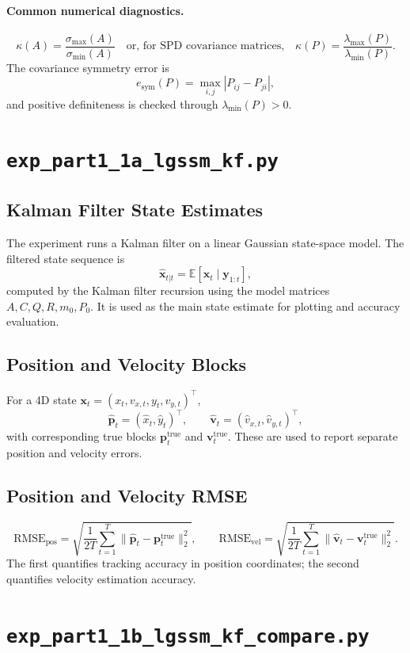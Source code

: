 \documentclass[11pt]{article}
\newcommand{\code}[1]{\texttt{#1}}
\newcommand{\E}{\mathbb{E}}
\newcommand{\RMSE}{\mathrm{RMSE}}
\begin{document}
\paragraph{Common numerical diagnostics.}
\[
\kappa(A)=\frac{\sigma_{\max}(A)}{\sigma_{\min}(A)}
\quad\text{or, for SPD covariance matrices,}\quad
\kappa(P)=\frac{\lambda_{\max}(P)}{\lambda_{\min}(P)}.
\]
The covariance symmetry error is
\[
e_{\mathrm{sym}}(P)=\max_{i,j}|P_{ij}-P_{ji}|,
\]
and positive definiteness is checked through \(\lambda_{\min}(P)>0\).

\clearpage

\section{\code{exp\_part1\_1a\_lgssm\_kf.py}}
\subsection*{Kalman Filter State Estimates}
The experiment runs a Kalman filter on a linear Gaussian state-space model. The filtered state sequence is
\[
\hat{\bm{x}}_{t|t}=\E[\bm{x}_t\mid \bm{y}_{1:t}],
\]
computed by the Kalman filter recursion using the model matrices \(A,C,Q,R,m_0,P_0\). It is used as the main state estimate for plotting and accuracy evaluation.

\subsection*{Position and Velocity Blocks}
For a 4D state \(\bm{x}_t=(x_t,v_{x,t},y_t,v_{y,t})^\top\),
\[
\hat{\bm{p}}_t=(\hat x_t,\hat y_t)^\top,\qquad
\hat{\bm{v}}_t=(\hat v_{x,t},\hat v_{y,t})^\top,
\]
with corresponding true blocks \(\bm{p}^{\mathrm{true}}_t\) and \(\bm{v}^{\mathrm{true}}_t\). These are used to report separate position and velocity errors.

\subsection*{Position and Velocity RMSE}
\[
\RMSE_{\mathrm{pos}}
=\sqrt{\frac{1}{2T}\sum_{t=1}^T\|\hat{\bm{p}}_t-\bm{p}^{\mathrm{true}}_t\|_2^2},
\qquad
\RMSE_{\mathrm{vel}}
=\sqrt{\frac{1}{2T}\sum_{t=1}^T\|\hat{\bm{v}}_t-\bm{v}^{\mathrm{true}}_t\|_2^2}.
\]
The first quantifies tracking accuracy in position coordinates; the second quantifies velocity estimation accuracy.

\section{\code{exp\_part1\_1b\_lgssm\_kf\_compare.py}}
\end{document}

